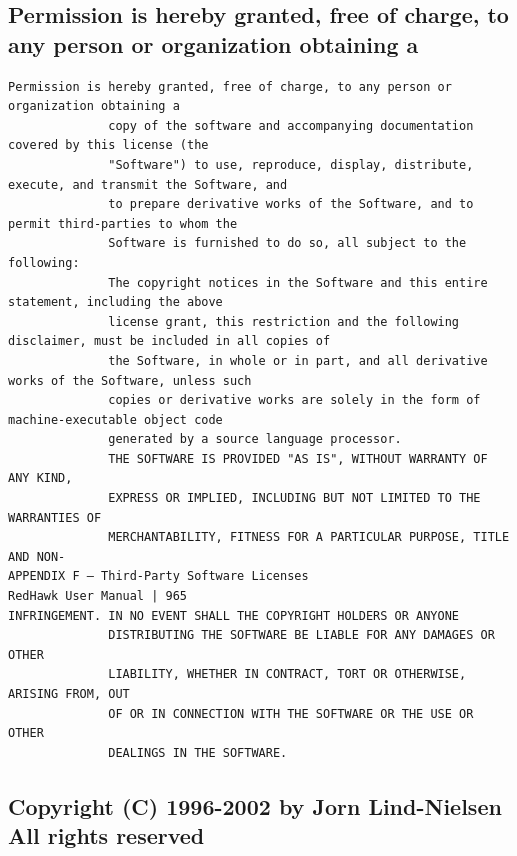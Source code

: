 \subsection{Permission is hereby granted, free of charge, to any person or organization obtaining a}

\begin{lstlisting}[basicstyle=\ttfamily\scriptsize,breaklines=true]
Permission is hereby granted, free of charge, to any person or organization obtaining a
              copy of the software and accompanying documentation covered by this license (the
              "Software") to use, reproduce, display, distribute, execute, and transmit the Software, and
              to prepare derivative works of the Software, and to permit third-parties to whom the
              Software is furnished to do so, all subject to the following:
              The copyright notices in the Software and this entire statement, including the above
              license grant, this restriction and the following disclaimer, must be included in all copies of
              the Software, in whole or in part, and all derivative works of the Software, unless such
              copies or derivative works are solely in the form of machine-executable object code
              generated by a source language processor.
              THE SOFTWARE IS PROVIDED "AS IS", WITHOUT WARRANTY OF ANY KIND,
              EXPRESS OR IMPLIED, INCLUDING BUT NOT LIMITED TO THE WARRANTIES OF
              MERCHANTABILITY, FITNESS FOR A PARTICULAR PURPOSE, TITLE AND NON-
APPENDIX F — Third-Party Software Licenses                                    RedHawk User Manual | 965
INFRINGEMENT. IN NO EVENT SHALL THE COPYRIGHT HOLDERS OR ANYONE
              DISTRIBUTING THE SOFTWARE BE LIABLE FOR ANY DAMAGES OR OTHER
              LIABILITY, WHETHER IN CONTRACT, TORT OR OTHERWISE, ARISING FROM, OUT
              OF OR IN CONNECTION WITH THE SOFTWARE OR THE USE OR OTHER
              DEALINGS IN THE SOFTWARE.
\end{lstlisting}

\subsection{Copyright (C) 1996-2002 by Jorn Lind-Nielsen All rights reserved}

